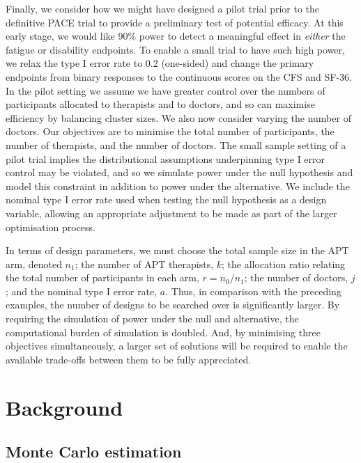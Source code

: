 \documentclass[]{sagej}
\begin{document}
Finally, we consider how we might have designed a pilot trial prior to the definitive PACE trial to provide a preliminary test of potential efficacy. At this early stage, we would like 90\% power to detect a meaningful effect in \emph{either} the fatigue or disability endpoints. To enable a small trial to have such high power, 
 we relax the type I error rate to 0.2 (one-sided) and change the primary endpoints from binary responses to the continuous scores on the CFS and SF-36. In the pilot setting we assume we have greater control over the numbers of participants allocated to therapists and to doctors, and so can maximise efficiency by balancing cluster sizes. We also now consider varying the number of doctors.  Our objectives are to minimise the total number of participants, the number of therapists, and the number of doctors. The small sample setting of a pilot trial implies the distributional assumptions underpinning type I error control may be violated, and so we simulate power under the null hypothesis and model this constraint in addition to power under the alternative. We include the nominal type I error rate used when testing the null hypothesis as a design variable, allowing an appropriate adjustment to be made as part of the larger optimisation process.
 
In terms of design parameters, we must choose the total sample size in the APT arm, denoted $n_1$; the number of APT therapists, $k$; the allocation ratio relating the total number of participants in each arm, $r = n_0/n_1$; the number of doctors, $j$; and the nominal type I error rate, $a$. Thus, in comparison with the preceding examples, the number of designs to be searched over is significantly larger. By requiring the simulation of power under the null and alternative, the computational burden of simulation is doubled. And, by minimising three objectives simultaneously, a larger set of solutions will be required to enable the available trade-offs between them to be fully appreciated. 

\section{Background}\label{sec:prelim}

\subsection{Monte Carlo estimation}\label{sec:MC}
\end{document}
